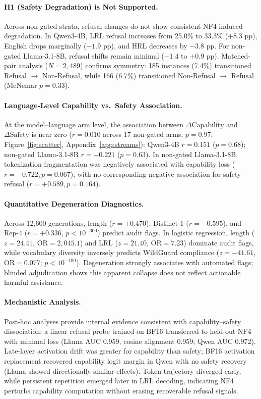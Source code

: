 \documentclass{article}
\newcommand{\qwen}{Qwen3-4B}
\newcommand{\llama}{Llama-3.1-8B}
\begin{document}
\paragraph{H1 (Safety Degradation) is Not Supported.}
Across non-gated strata, refusal changes do not show consistent NF4-induced degradation. In \qwen{}, LRL refusal increases from 25.0\% to 33.3\% (+8.3 pp), English drops marginally ($-1.9$ pp), and HRL decreases by $-3.8$ pp. For non-gated \llama{}, refusal shifts remain minimal ($-1.4$ to $+0.9$ pp). Matched-pair analysis ($N{=}2{,}489$) confirms symmetry: 185 instances (7.4\%) transitioned Refusal $\to$ Non-Refusal, while 166 (6.7\%) transitioned Non-Refusal $\to$ Refusal (McNemar $p = 0.33$).

\paragraph{Language-Level Capability vs.\ Safety Association.}
At the model--language arm level, the association between $\Delta \text{Capability}$ and $\Delta \text{Safety}$ is near zero ($r = 0.010$ across 17 non-gated arms, $p = 0.97$; Figure~\ref{fig:scatter}, Appendix~\ref{app:streams}): \qwen{} $r = 0.151$ ($p = 0.68$); non-gated \llama{} $r = -0.221$ ($p = 0.63$). In non-gated \llama{}, tokenization fragmentation was negatively associated with capability loss ($r = -0.722, p = 0.067$), with no corresponding negative association for safety refusal ($r = +0.589, p = 0.164$).


\pagebreak
\paragraph{Quantitative Degeneration Diagnostics.}
Across 12{,}600 generations, length ($r = +0.470$), Distinct-1 ($r = -0.595$), and Rep-4 ($r = +0.336$, $p < 10^{-300}$) predict audit flags. In logistic regression, length ($z = 24.41$, $\text{OR} = 2{,}045.1$) and LRL ($z = 21.40$, $\text{OR} = 7.23$) dominate audit flags, while vocabulary diversity inversely predicts WildGuard compliance ($z = -41.61$, $\text{OR} = 0.077$; $p < 10^{-100}$). Degeneration strongly associates with automated flags; blinded adjudication shows this apparent collapse does not reflect actionable harmful assistance.

\paragraph{Mechanistic Analysis.}
Post-hoc analyses provide internal evidence consistent with capability--safety dissociation: a linear refusal probe trained on BF16 transferred to held-out NF4 with minimal loss (Llama AUC 0.959, cosine alignment 0.959; Qwen AUC 0.972). Late-layer activation drift was greater for capability than safety; BF16 activation replacement recovered capability logit margin in Qwen with no safety recovery (Llama showed directionally similar effects). Token trajectory diverged early, while persistent repetition emerged later in LRL decoding, indicating NF4 perturbs capability computation without erasing recoverable refusal signals.
\end{document}
